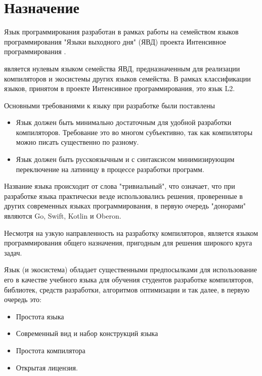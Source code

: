 \hypertarget{назначение}{
\section{Назначение}\label{наз:назначение}}

Язык программирования \thelang{} разработан в рамках работы на семейством языков программирования "Языки выходного дня"  (ЯВД) \needlink{} проекта Интенсивное программирования \needlink{}.

\thelang{} является нулевым языком семейства ЯВД, предназначенным для реализации компиляторов и экосистемы других языков семейства. В рамках классификации языков, принятом в проекте Интенсивное программирования, это язык L2.


Основными требованиями к языку при разработке были поставлены
\begin{itemize}
\item 
    Язык должен быть минимально достаточным для удобной разработки компиляторов. Требование это во многом субъективно, так как компиляторы можно писать существенно по разному.
\item 
    Язык должен быть русскоязычным и с синтаксисом минимизирующим переключение на латиницу в процессе разработки программ.
\end{itemize}

Название языка происходит от слова "тривиальный", что означает, что при разработке языка практически везде использовались решения, проверенные в других современных языках программирования, в первую очередь "донорами" являются Go, Swift, Kotlin и Oberon.

Несмотря на узкую направленность на разработку компиляторов, \thelang{} является языком программирования общего назначения, пригодным для решения широкого круга задач.

Язык (и экосистема) обладает существенными предпосылками для использование его в качестве учебного языка для обучения студентов разработке компиляторов, библиотек, средств разработки, алгоритмов оптимизации и так далее, в первую очередь это:
\begin{itemize}
\item 
    Простота языка
\item 
    Современный вид и набор конструкций языка
\item 
    Простота компилятора
\item 
    Открытая лицензия.
\end{itemize}

